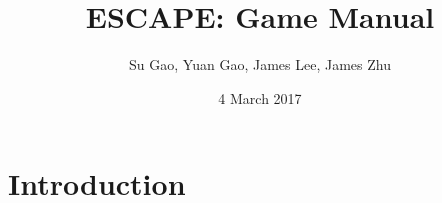 \documentclass{article}
\title{\color{white}ESCAPE: Game Manual}
\author{\color{white}Su Gao, Yuan Gao, James Lee, James Zhu }
\date{\color{white}4 March 2017}
\begin{document}
\makeatletter
    \begin{titlepage}
        \begin{center}
            \begin{center}
            \end{center}
        \end{center}
    \end{titlepage}
\makeatother
{}
\maketitle
\pagecolor{gray}
\newpage
\color{white}
\tableofcontents

\section{Introduction}
\end{document}
